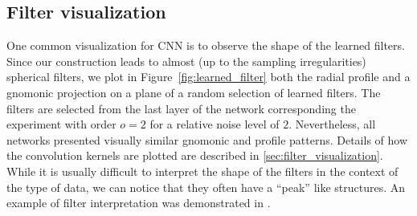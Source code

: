 \documentclass[final,twocolumn,3p,times,authoryear]{elsarticle}
\newcommand{\TK}[1]{{\color{red}{TK:#1}}}
\newcommand{\todo}[1]{{\color[rgb]{.6,.1,.6}{#1}}}
\newcommand{\figref}[1]{Figure~\ref{fig:#1}}
\newcommand{\1}{\b{1}}              %
\newcommand{\0}{\b{0}}              %
\begin{document}
\subsection{Filter visualization}
One common visualization for CNN is to observe the shape of the learned filters.
Since our construction leads to almost (up to the sampling irregularities) spherical filters, we plot in \figref{learned_filter} both the radial profile and a gnomonic projection on a plane of a random selection of learned filters.
The filters are selected from the last layer of the network corresponding the experiment with order $o=2$ for a relative noise level of $2$.
Nevertheless, all networks presented visually similar gnomonic and profile patterns.
Details of how the convolution kernels are plotted are described in \ref{sec:filter_visualization}.
While it is usually difficult to interpret the shape of the filters in the context of the type of data, we can notice that they often have a ``peak'' like structures.
An example of filter interpretation was demonstrated in \citep{Ribli2018learningfrom}.
\end{document}
